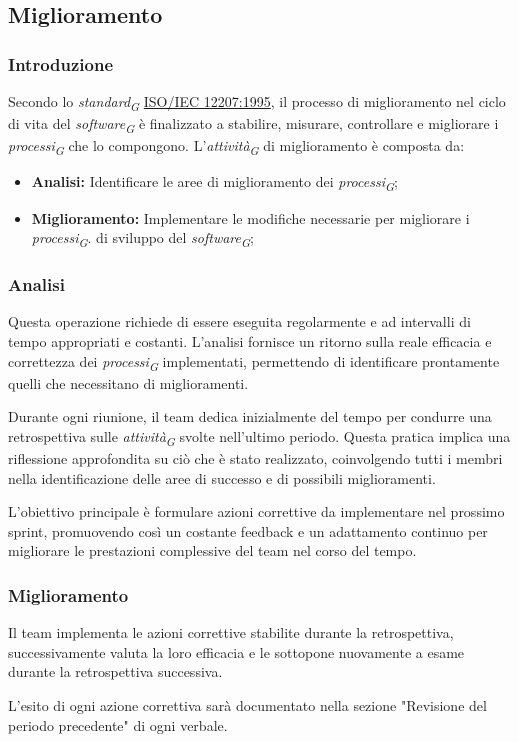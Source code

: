 \subsection{Miglioramento}
\subsubsection{Introduzione}
Secondo lo \textit{standard}\textsubscript{\textit{G}} \href{https://www.math.unipd.it/~tullio/IS-1/2009/Approfondimenti/ISO_12207-1995.pdf}{ISO/IEC 12207:1995}, il processo di miglioramento nel ciclo di vita del \textit{software}\textsubscript{\textit{G}} è finalizzato a stabilire, misurare, controllare e migliorare i \textit{processi}\textsubscript{\textit{G}} che lo compongono.
L'\textit{attività}\textsubscript{\textit{G}} di miglioramento è composta da:
 \begin{itemize}
    \item \textbf{Analisi:} Identificare le aree di miglioramento dei \textit{processi}\textsubscript{\textit{G}}; 
    \item  \textbf{Miglioramento:} Implementare le modifiche necessarie per migliorare i \textit{processi}\textsubscript{\textit{G}}. 
    di sviluppo del \textit{software}\textsubscript{\textit{G}};
 \end{itemize}
 \subsubsection{Analisi}
Questa operazione richiede di essere eseguita regolarmente e ad intervalli di tempo appropriati e costanti. L'analisi fornisce un ritorno sulla reale efficacia e correttezza dei \textit{processi}\textsubscript{\textit{G}} implementati, permettendo di identificare prontamente quelli che necessitano di miglioramenti.

\vspace*{0.2cm}

Durante ogni riunione, il team dedica inizialmente del tempo per condurre una retrospettiva sulle \textit{attività}\textsubscript{\textit{G}} svolte nell'ultimo periodo. Questa pratica implica una riflessione approfondita su ciò che è stato realizzato, coinvolgendo tutti i membri nella identificazione delle aree di successo e di possibili miglioramenti. 

L'obiettivo principale è formulare azioni correttive da implementare nel prossimo sprint, promuovendo così un costante feedback e un adattamento continuo per migliorare le prestazioni complessive del team nel corso del tempo. 

\subsubsection{Miglioramento}
Il team implementa le azioni correttive stabilite durante la retrospettiva, successivamente valuta la loro efficacia e le sottopone nuovamente a esame durante la retrospettiva successiva.

L'esito di ogni azione correttiva sarà documentato nella sezione "Revisione del periodo precedente" di ogni verbale. 
